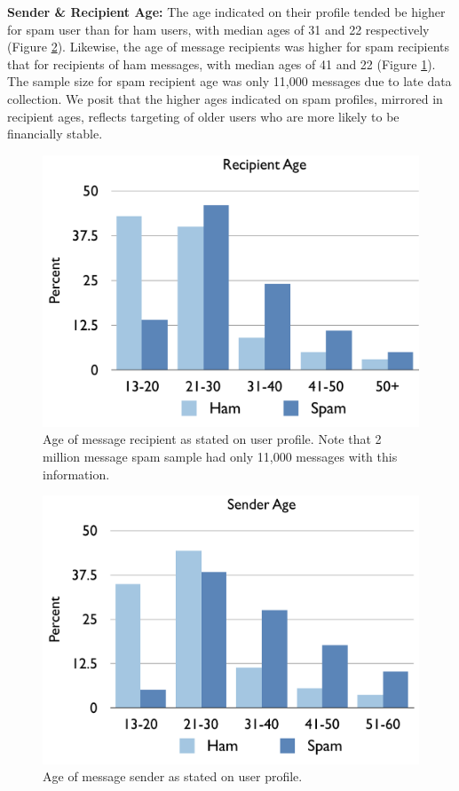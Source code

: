 \documentclass[preprint]{acm_proc_article-sp}
\begin{document}
\textbf{Sender \& Recipient Age:} The age indicated on their profile tended be higher for spam user than 
for ham users, with median ages of 31 and 22 respectively (Figure \ref{fig:sendage}). Likewise, the 
age of message recipients was higher for spam recipients that for recipients of ham messages, with 
median ages of 41 and 22 (Figure \ref{fig:recipage}). The sample size for spam recipient age 
was only 11,000 messages due to late data collection. We posit that the higher ages indicated on spam profiles, 
mirrored in recipient ages, reflects targeting of older users who are more likely to be financially 
stable. 

\begin{figure}[h]
    \centering
    \includegraphics[width=\linewidth]{figures/recip-age.pdf}
    \caption{Age of message recipient as stated on user profile. Note that 2 million message spam sample 
        had only 11,000 messages with this information.}
    \label{fig:recipage}
\end{figure}

\begin{figure}[h]
    \centering
    \includegraphics[width=\linewidth]{figures/sender-age.pdf}
    \caption{Age of message sender as stated on user profile. }
    \label{fig:sendage}
\end{figure}
\end{document}
